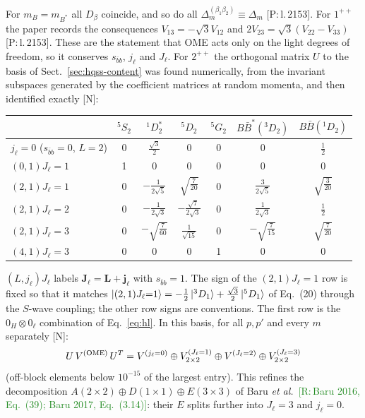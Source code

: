 \documentclass[11pt,a4paper]{article}
\newcommand{\tagP}[1]{\textcolor{blue!65!black}{\textsf{\small[P:\,#1]}}}
\newcommand{\tagR}[1]{\textcolor{ForestGreen}{\textsf{\small[R:\,#1]}}}
\newcommand{\tagN}{\textcolor{red!70!black}{\textsf{\small[N]}}}
\newcommand{\BB}{B\bar B}
\newcommand{\BBst}{B\bar B^*}
\newcommand{\VOME}{V^{\rm (OME)}}
\newcommand{\D}[2]{\Delta^{(#1)}_{#2}}
\begin{document}
For $m_B=m_{B^*}$ all $D_\beta$ coincide, and so do all $\D{\beta_1\beta_2}{m}\equiv\Delta_m$ \tagP{l.\,2153}. For $1^{++}$ the paper records the consequences $V_{13}=-\sqrt3V_{12}$ and $2V_{23}=\sqrt3(V_{22}-V_{33})$ \tagP{l.\,2153}. These are the statement that OME acts only on the light degrees of freedom, so it conserves $s_{\bar bb}$, $j_\ell$ and $J_\ell$. For $2^{++}$ the orthogonal matrix $U$ to the basis of Sect.~\ref{sec:hqss-content} was found numerically, from the invariant subspaces generated by the coefficient matrices at random momenta, and then identified exactly \tagN:
\begin{center}
\small
\renewcommand{\arraystretch}{1.25}
\begin{tabular}{l|cccccc}
& $^5S_2$ & $^1D_2^*$ & $^5D_2$ & $^5G_2$ & $\BBst(^3D_2)$ & $\BB(^1D_2)$\\
\hline
$j_\ell=0$ ($s_{\bar bb}=0$, $L=2$) & 0 & $\frac{\sqrt3}{2}$ & 0 & 0 & 0 & $\frac12$\\
$(0,1)J_\ell{=}1$ & 1 & 0 & 0 & 0 & 0 & 0\\
$(2,1)J_\ell{=}1$ & 0 & $-\frac{1}{2\sqrt5}$ & $\sqrt{\frac{7}{20}}$ & 0 & $\frac{3}{2\sqrt5}$ & $\sqrt{\frac{3}{20}}$\\
$(2,1)J_\ell{=}2$ & 0 & $-\frac{1}{2\sqrt3}$ & $-\frac{\sqrt7}{2\sqrt3}$ & 0 & $\frac{1}{2\sqrt3}$ & $\frac12$\\
$(2,1)J_\ell{=}3$ & 0 & $-\sqrt{\frac{7}{60}}$ & $\frac{1}{\sqrt{15}}$ & 0 & $-\sqrt{\frac{7}{15}}$ & $\sqrt{\frac{7}{20}}$\\
$(4,1)J_\ell{=}3$ & 0 & 0 & 0 & 1 & 0 & 0\\
\end{tabular}
\end{center}
$(L,j_\ell)J_\ell$ labels $\bm J_\ell=\bm L+\bm j_\ell$ with $s_{\bar bb}=1$. The sign of the $(2,1)J_\ell{=}1$ row is fixed so that it matches $\ket{(2,1)J_\ell{=}1}=-\frac12\ket{^3D_1}+\frac{\sqrt3}{2}\ket{^5D_1}$ of Eq.~(20) through the $S$-wave coupling; the other row signs are conventions. The first row is the $0_H\otimes0_\ell$ combination of Eq.~\eqref{eq:hl}. In this basis, for all $p,p'$ and every $m$ separately \tagN:
\begin{equation}
U\,\VOME\,U^T=V^{(j_\ell=0)}\oplus V^{(J_\ell=1)}_{2\times2}\oplus V^{(J_\ell=2)}\oplus V^{(J_\ell=3)}_{2\times2}
\label{eq:blocks}
\end{equation}
(off-block elements below $10^{-15}$ of the largest entry). This refines the decomposition $A(2\times2)\oplus D(1\times1)\oplus E(3\times3)$ of Baru \emph{et al.}\ \tagR{Baru 2016, Eq.~(39); Baru 2017, Eq.~(3.14)}: their $E$ splits further into $J_\ell=3$ and $j_\ell=0$.
\end{document}
